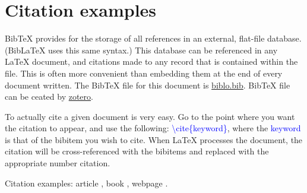 \section{Citation examples}

BibTeX provides for the storage of all references in an external, flat-file database. (BibLaTeX uses this same syntax.) This database can be referenced in any LaTeX document, and citations made to any record that is contained within the file. This is often more convenient than embedding them at the end of every document written. The BibTeX file for this document is \href{biblo.bib}{biblo.bib}. BibTeX file can be ceated by \href{https://www.zotero.org/}{zotero}.

To actually cite a given document is very easy. Go to the point where you want the citation to appear, and use the following: 
\textcolor{blue}{\textbackslash cite\{keyword\}}, where the \textcolor{blue}{keyword} is that of the bibitem you wish to cite. When LaTeX processes the document, the citation will be cross-referenced with the bibitems and replaced with the appropriate number citation. 

Citation examples: article \cite{Beauregard2005}, book \cite{Hicks2006}, webpage \cite{spotcrime,doboszczak}.
